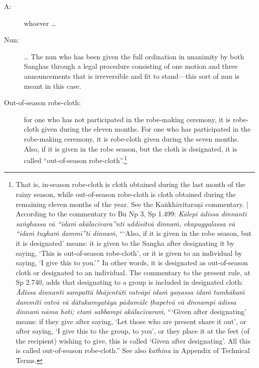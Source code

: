 \documentclass[12pt,openany]{book}%
\begin{document}
\begin{description}%
\item[A: ] whoever … %
\item[Nun: ] … The nun who has been given the full ordination in unanimity by both Sanghas through a legal procedure consisting of one motion and three announcements that is irreversible and fit to stand—this sort of nun is meant in this case. %
\item[Out-of-season robe-cloth: ] for one who has not participated in the robe-making ceremony, it is robe-cloth given during the eleven months. For one who has participated in the robe-making ceremony, it is robe-cloth given during the seven months. Also, if it is given in the robe season, but the cloth is designated, it is called “out-of-season robe-cloth”.\footnote{That is, in-season robe-cloth is cloth obtained during the last month of the rainy season, while out-of-season robe-cloth is cloth obtained during the remaining eleven months of the year. See the \textsanskrit{Kaṅkhāvitaraṇī} commentary. | According to the commentary to Bu Np 3, Sp 1.499: \textit{\textsanskrit{Kālepi} \textsanskrit{ādissa} dinnanti \textsanskrit{saṅghassa} \textsanskrit{vā} “\textsanskrit{idaṁ} \textsanskrit{akālacīvara}”nti \textsanskrit{uddisitvā} \textsanskrit{dinnaṁ}, ekapuggalassa \textsanskrit{vā} “\textsanskrit{idaṁ} \textsanskrit{tuyhaṁ} \textsanskrit{dammī}”ti \textsanskrit{dinnaṁ}}, “‘Also, if it is given in the robe season, but it is designated’ means: it is given to the Sangha after designating it by saying, ‘This is out-of-season robe-cloth’, or it is given to an individual by saying, ‘I give this to you.’” In other words, it is designated as out-of-season cloth or designated to an individual. The commentary to the present rule, at Sp 2.740, adds that designating to a group is included in designated cloth: \textit{Ādissa dinnanti \textsanskrit{sampattā} \textsanskrit{bhājentūti} \textsanskrit{vatvāpi} \textsanskrit{idaṁ} \textsanskrit{gaṇassa} \textsanskrit{idaṁ} \textsanskrit{tumhākaṁ} \textsanskrit{dammīti} \textsanskrit{vatvā} \textsanskrit{vā} \textsanskrit{dātukamyatāya} \textsanskrit{pādamūle} \textsanskrit{ṭhapetvā} \textsanskrit{vā} dinnampi \textsanskrit{ādissa} \textsanskrit{dinnaṁ} \textsanskrit{nāma} hoti; \textsanskrit{etaṁ} sabbampi \textsanskrit{akālacīvaraṁ}}, “‘Given after designating’ means: if they give after saying, ‘Let those who are present share it out’, or after saying, ‘I give this to the group, to you’, or they place it at the feet (of the recipient) wishing to give, this is called ‘Given after designating’. All this is called out-of-season robe-cloth.” See also \textit{kathina} in Appendix of Technical Terms. } %
\end{description}
\end{document}
